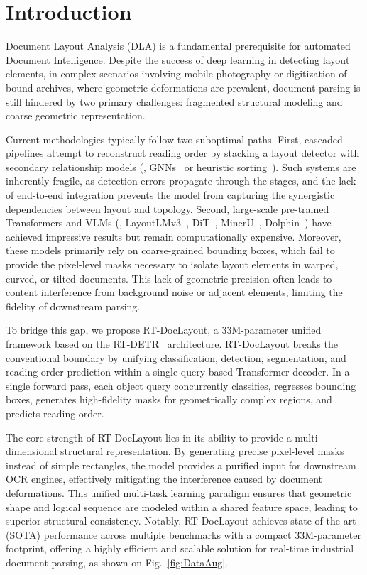 \documentclass[11pt, a4paper,logo,  copyright, nonumbering]{paddleocr}
\begin{document}
\section{Introduction}
\label{sec:intro}


Document Layout Analysis (DLA) is a fundamental prerequisite for automated Document Intelligence. Despite the success of deep learning in detecting layout elements, in complex scenarios involving mobile photography or digitization of bound archives, where geometric deformations are prevalent, document parsing is still hindered by two primary challenges: fragmented structural modeling and coarse geometric representation.

Current methodologies typically follow two suboptimal paths. First, cascaded pipelines attempt to reconstruct reading order by stacking a layout detector with secondary relationship models (\eg, GNNs~\cite{lee2021ropereadingorderequivariant} or heuristic sorting~\cite{ha1995recursive}). Such systems are inherently fragile, as detection errors propagate through the stages, and the lack of end-to-end integration prevents the model from capturing the synergistic dependencies between layout and topology. Second, large-scale pre-trained Transformers and VLMs (\eg, LayoutLMv3~\cite{huang2022layoutlmv3pretrainingdocumentai}, DiT~\cite{li2022ditselfsupervisedpretrainingdocument}, MinerU~\cite{niu2025mineru25decoupledvisionlanguagemodel}, Dolphin~\cite{feng2025dolphindocumentimageparsing}) have achieved impressive results but remain computationally expensive. Moreover, these models primarily rely on coarse-grained bounding boxes, which fail to provide the pixel-level masks necessary to isolate layout elements in warped, curved, or tilted documents. This lack of geometric precision often leads to content interference from background noise or adjacent elements, limiting the fidelity of downstream parsing.

To bridge this gap, we propose RT-DocLayout, a 33M-parameter unified framework based on the RT-DETR~\cite{zhao2024detrsbeatyolosrealtime} architecture. RT-DocLayout breaks the conventional boundary by unifying classification, detection, segmentation, and reading order prediction within a single query-based Transformer decoder. In a single forward pass, each object query concurrently classifies, regresses bounding boxes, generates high-fidelity masks for geometrically complex regions, and predicts reading order.

The core strength of RT-DocLayout lies in its ability to provide a multi-dimensional structural representation. 
By generating precise pixel-level masks instead of simple rectangles, the model provides a purified input for downstream OCR engines, effectively mitigating the interference caused by document deformations. 
This unified multi-task learning paradigm ensures that geometric shape and logical sequence are modeled within a shared feature space, leading to superior structural consistency. Notably, RT-DocLayout achieves state-of-the-art (SOTA) performance across multiple benchmarks with a compact 33M-parameter footprint, offering a highly efficient and scalable solution for real-time industrial document parsing, as shown on Fig.~\ref{fig:DataAug}.
\end{document}
